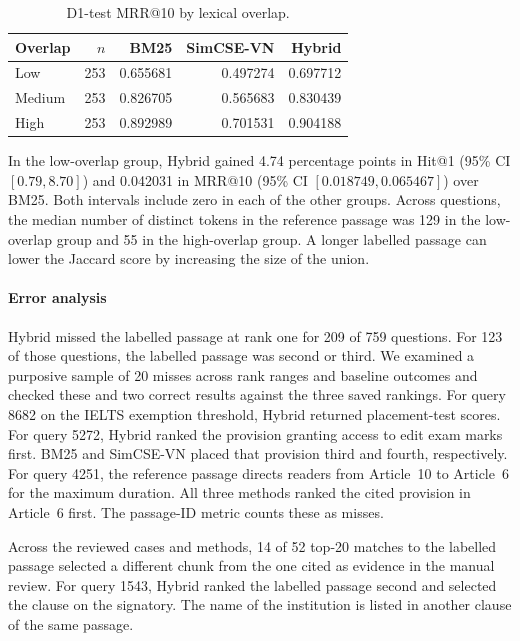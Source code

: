 \begin{table}[htbp]
\caption{D1-test MRR@10 by lexical overlap.}
\label{tab:d1-overlap}
\centering\footnotesize
\setlength{\tabcolsep}{3pt}
\begin{tabular}{@{}lrrrr@{}}
\hline
Overlap & $n$ & BM25 & SimCSE-VN & Hybrid \\
\hline
Low & 253 & 0.655681 & 0.497274 & 0.697712 \\
Medium & 253 & 0.826705 & 0.565683 & 0.830439 \\
High & 253 & 0.892989 & 0.701531 & 0.904188 \\
\hline
\end{tabular}
\end{table}

In the low-overlap group, Hybrid gained 4.74 percentage points in Hit@1
(95\% CI $[0.79, 8.70]$) and 0.042031 in MRR@10
(95\% CI $[0.018749, 0.065467]$) over BM25. Both intervals include zero
in each of the other groups. Across questions, the median number of
distinct tokens in the reference passage was 129 in the low-overlap
group and 55 in the high-overlap group. A longer labelled passage can
lower the Jaccard score by increasing the size of the union.

\paragraph{Error analysis}
Hybrid missed the labelled passage at rank one for 209 of 759 questions.
For 123 of those questions, the labelled passage was second or third.
We examined a purposive sample of 20 misses across rank ranges and baseline
outcomes and checked these and two correct results against the three saved
rankings. For query 8682 on the IELTS exemption threshold, Hybrid returned
placement-test scores. For query 5272,
Hybrid ranked the provision granting access to edit exam marks first.
BM25 and SimCSE-VN placed that provision third and fourth, respectively.
For query 4251, the reference passage directs readers from Article~10 to
Article~6 for the maximum duration. All three methods ranked the cited
provision in Article~6 first. The passage-ID metric counts these as misses.

Across the reviewed cases and methods, 14 of 52 top-20 matches to the
labelled passage selected a different chunk from the one cited as evidence
in the manual review. For query 1543, Hybrid ranked the labelled passage
second and selected the clause on the signatory. The name of the institution
is listed in another clause of the same passage.

